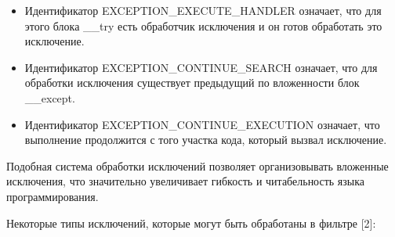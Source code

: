 \documentclass[14pt,a4paper,report]{report}
\begin{document}
\begin{itemize}
	\item Идентификатор EXCEPTION\_EXECUTE\_HANDLER означает, что для этого блока \_\_try есть обработчик исключения и он готов обработать это исключение.
	\item Идентификатор EXCEPTION\_CONTINUE\_SEARCH означает, что для обработки исключения существует предыдущий по вложенности блок \_\_except.
	\item Идентификатор EXCEPTION\_CONTINUE\_EXECUTION означает, что выполнение продолжится с того участка кода, который вызвал исключение.
\end{itemize}

Подобная система обработки исключений позволяет организовывать вложенные исключения, что значительно увеличивает гибкость и читабельность языка программирования.

Некоторые типы исключений, которые могут быть обработаны в фильтре [2]:
\end{document}

